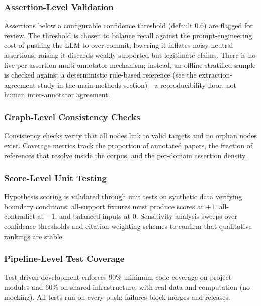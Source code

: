 \documentclass[
  english,
]{article}
\begin{document}
{{{{{{{{{{{{{{{{\subsubsection{Assertion-Level
Validation}\label{assertion-level-validation}

Assertions below a configurable confidence threshold (default 0.6) are
flagged for review. The threshold is chosen to balance recall against
the prompt-engineering cost of pushing the LLM to over-commit; lowering
it inflates noisy neutral assertions, raising it discards weakly
supported but legitimate claims. There is no live per-assertion
multi-annotator mechanism; instead, an offline stratified sample is
checked against a deterministic rule-based reference (see the
extraction-agreement study in the main methods section)---a
reproducibility floor, not human inter-annotator agreement.

\subsubsection{Graph-Level Consistency
Checks}\label{graph-level-consistency-checks}

Consistency checks verify that all nodes link to valid targets and no
orphan nodes exist. Coverage metrics track the proportion of annotated
papers, the fraction of references that resolve inside the corpus, and
the per-domain assertion density.

\subsubsection{Score-Level Unit Testing}\label{score-level-unit-testing}

Hypothesis scoring is validated through unit tests on synthetic data
verifying boundary conditions: all-support fixtures must produce scores
at \(+1\), all-contradict at \(-1\), and balanced inputs at \(0\).
Sensitivity analysis sweeps over confidence thresholds and
citation-weighting schemes to confirm that qualitative rankings are
stable.

\subsubsection{Pipeline-Level Test
Coverage}\label{pipeline-level-test-coverage}

Test-driven development enforces 90\% minimum code coverage on project
modules and 60\% on shared infrastructure, with real data and
computation (no mocking). All tests run on every push; failures block
merges and releases.

}}}}}}}}}}}}}}}}
\end{document}

